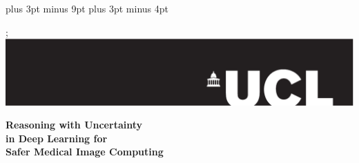\documentclass[12pt,a4paper,twoside]{book}
\newcommand{\HRule}{\rule{\linewidth}{0.5mm}}
\newcommand{\FrontPageStyle}{\pagestyle{empty}}
\begin{document}
\belowdisplayskip=12pt plus 3pt minus 9pt
\belowdisplayshortskip=7pt plus 3pt minus 4pt

\FrontPageStyle{}

\begin{titlepage}
\begin{center}

% 
% 

\vspace*{-9em}; 
\hbox{ \hspace*{-18em} \includegraphics[width=1.7\textwidth]{images/univ_logo-eps-converted-to.pdf}}
\null%
\vspace*{7em}%

{\Large 

{ \Huge \textbf{Reasoning with Uncertainty \\ in Deep Learning for \\ Safer Medical Image Computing}\\ [0.4cm]}




}
\end{center}
\end{titlepage}
\end{document}
